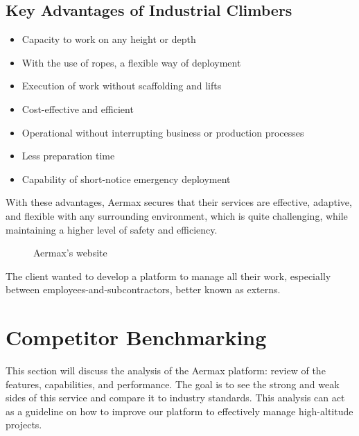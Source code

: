 \newpage


\subsection*{Key Advantages of Industrial Climbers}
\begin{itemize}
  \item Capacity to work on any height or depth
  \item With the use of ropes, a flexible way of deployment
  \item Execution of work without scaffolding and lifts
  \item Cost-effective and efficient
  \item Operational without interrupting business or production processes
  \item Less preparation time
  \item Capability of short-notice emergency deployment
\end{itemize}

With these advantages, Aermax secures that their services are effective, adaptive, and flexible with any surrounding environment, which is quite challenging, while maintaining a higher level of safety and efficiency.

\begin{figure}[H]
    \centering
    \caption{Aermax’s website}
    \label{fig:aermax-website}
\end{figure}

The client wanted to develop a platform to manage all their work, especially between employees-and-subcontractors, better known as externs.

\section{Competitor Benchmarking}
This section will discuss the analysis of the Aermax platform: review of the features, capabilities, and performance. The goal is to see the strong and weak sides of this service and compare it to industry standards. This analysis can act as a guideline on how to improve our platform to effectively manage high-altitude projects.
